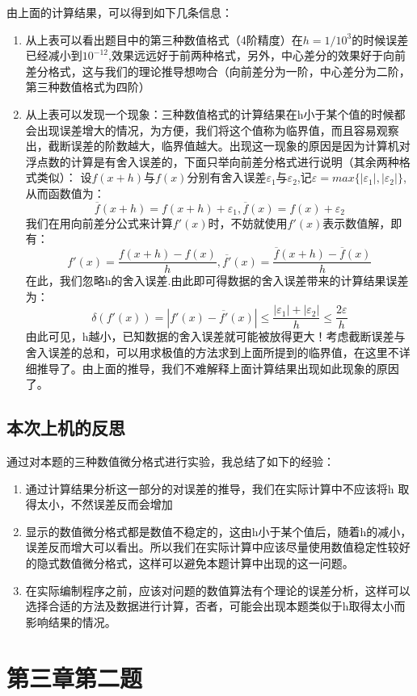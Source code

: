 \documentclass[10pt,a4paper]{ctexart}
\begin{document}
由上面的计算结果，可以得到如下几条信息：
\begin{enumerate}
\item 
从上表可以看出题目中的第三种数值格式（4阶精度）在$h=1/10^{3}$的时候误差已经减小到$10^{-12}$,效果远远好于前两种格式，另外，中心差分的效果好于向前差分格式，这与我们的理论推导想吻合（向前差分为一阶，中心差分为二阶，第三种数值格式为四阶）
\item
从上表可以发现一个现象：三种数值格式的计算结果在h小于某个值的时候都会出现误差增大的情况，为方便，我们将这个值称为临界值，而且容易观察出，截断误差的阶数越大，临界值越大。出现这一现象的原因是因为计算机对浮点数的计算是有舍入误差的，下面只举向前差分格式进行说明（其余两种格式类似）：
设$f(x+h)$与$f(x)$分别有舍入误差$\varepsilon_1$与$\varepsilon_2$,记$\varepsilon=max\{|\varepsilon_1|,|\varepsilon_2|\}$,从而函数值为：
\[\overline{f}(x+h)=f(x+h)+\varepsilon_1,\overline{f}(x)=f(x)+\varepsilon_2\]
我们在用向前差分公式来计算$f'(x)$时，不妨就使用$f'(x)$表示数值解，即有：
\[f'(x)=\dfrac{f(x+h)-f(x)}{h},\overline{f'}(x)=\dfrac{\overline{f}(x+h)-\overline{f}(x)}{h}\]
在此，我们忽略h的舍入误差.由此即可得数据的舍入误差带来的计算结果误差为：
\[\delta(f'(x))=|f'(x)-\overline{f'}(x)|\leq \dfrac{|\varepsilon_1|+|\varepsilon_2|}{h}\leq \dfrac{2\varepsilon}{h}\]
由此可见，h越小，已知数据的舍入误差就可能被放得更大！考虑截断误差与
舍入误差的总和，可以用求极值的方法求到上面所提到的临界值，在这里不详细推导了。由上面的推导，我们不难解释上面计算结果出现如此现象的原因了。
\end{enumerate}
\subsection{本次上机的反思}
通过对本题的三种数值微分格式进行实验，我总结了如下的经验：
\begin{enumerate}
\item 通过计算结果分析这一部分的对误差的推导，我们在实际计算中不应该将h
取得太小，不然误差反而会增加
\item 
显示的数值微分格式都是数值不稳定的，这由h小于某个值后，随着h的减小，误差反而增大可以看出。所以我们在实际计算中应该尽量使用数值稳定性较好的隐式数值微分格式，这样可以避免本题计算中出现的这一问题。
\item 
在实际编制程序之前，应该对问题的数值算法有个理论的误差分析，这样可以选择合适的方法及数据进行计算，否者，可能会出现本题类似于h取得太小而影响结果的情况。
\end{enumerate}
\section{第三章第二题}
\end{document}
